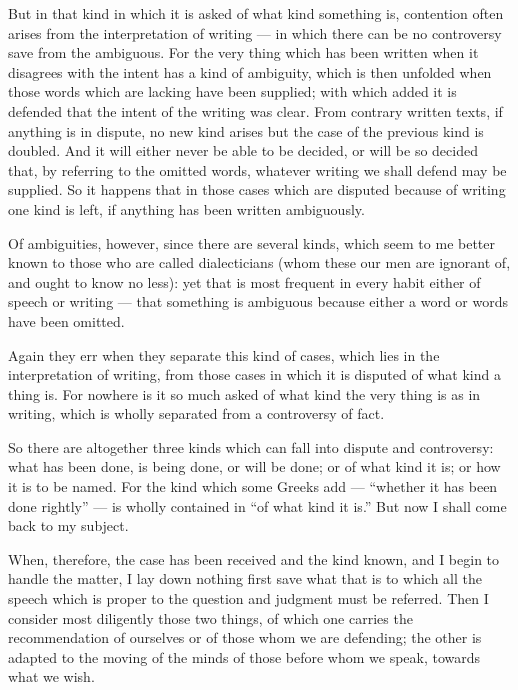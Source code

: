  But in that kind in which it is asked of what kind something is, contention often arises from the interpretation of writing — in which there can be no controversy save from the ambiguous. For the very thing which has been written when it disagrees with the intent has a kind of ambiguity, which is then unfolded when those words which are lacking have been supplied; with which added it is defended that the intent of the writing was clear. From contrary written texts, if anything is in dispute, no new kind arises but the case of the previous kind is doubled. And it will either never be able to be decided, or will be so decided that, by referring to the omitted words, whatever writing we shall defend may be supplied. So it happens that in those cases which are disputed because of writing one kind is left, if anything has been written ambiguously.

 Of ambiguities, however, since there are several kinds, which seem to me better known to those who are called dialecticians (whom these our men are ignorant of, and ought to know no less): yet that is most frequent in every habit either of speech or writing — that something is ambiguous because either a word or words have been omitted.

 Again they err when they separate this kind of cases, which lies in the interpretation of writing, from those cases in which it is disputed of what kind a thing is. For nowhere is it so much asked of what kind the very thing is as in writing, which is wholly separated from a controversy of fact.

 So there are altogether three kinds which can fall into dispute and controversy: what has been done, is being done, or will be done; or of what kind it is; or how it is to be named. For the kind which some Greeks add — ``whether it has been done rightly'' — is wholly contained in ``of what kind it is.'' But now I shall come back to my subject.

 When, therefore, the case has been received and the kind known, and I begin to handle the matter, I lay down nothing first save what that is to which all the speech which is proper to the question and judgment must be referred. Then I consider most diligently those two things, of which one carries the recommendation of ourselves or of those whom we are defending; the other is adapted to the moving of the minds of those before whom we speak, towards what we wish.

